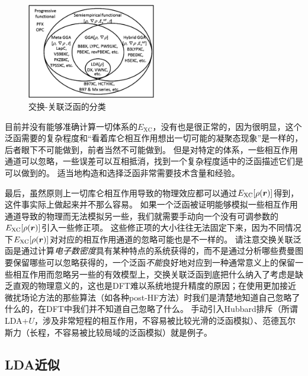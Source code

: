 \begin{figure}
    \centering
    \includegraphics[width=0.5\textwidth]{functional-classification.png}
    \caption{交换-关联泛函的分类}
    \label{fig:excahnge-correlation-functional}
\end{figure}

目前并没有能够准确计算一切体系的$E_\text{XC}$，没有也是很正常的，因为很明显，这个泛函需要的复杂程度和“看着库仑相互作用想出一切可能的凝聚态现象”是一样的，后者眼下不可能做到，前者当然不可能做到。
但是对特定的体系，一些相互作用通道可以忽略，一些误差可以互相抵消，找到一个复杂程度适中的泛函描述它们是可以做到的。
适当地构造和选择泛函非常需要技术含量和经验。

最后，虽然原则上一切库仑相互作用导致的物理效应都可以通过$E_\text{XC}[\rho(\vb*{r})]$得到，这件事实际上做起来并不那么容易。
如果一个泛函被证明能够模拟一些相互作用通道导致的物理而无法模拟另一些，我们就需要手动向一个没有可调参数的$E_\text{XC}[\rho(\vb*{r})]$引入一些修正项。
这些修正项的大小往往无法固定下来，因为不同情况下$E_\text{XC}[\rho(\vb*{r})]$对对应的相互作用通道的忽略可能也是不一样的。
请注意交换关联泛函是通过计算\emph{电子数密度}具有某种特点的系统获得的，而不是通过分析哪些费曼图要保留哪些可以忽略获得的，一个泛函\emph{不能}良好地对应到一种通常意义上的保留一些相互作用而忽略另一些的有效模型上，交换关联泛函到底把什么纳入了考虑是缺乏直观的物理意义的，这也是DFT难以系统地提升精度的原因；在使用更加接近微扰场论方法的那些算法（如各种post-HF方法）时我们是清楚地知道自己忽略了什么的，在DFT中我们并不知道自己忽略了什么。
手动引入Hubbard排斥（所谓LDA+$U$，涉及非常短程的相互作用，不容易被比较光滑的泛函模拟）、范德瓦尔斯力（长程，不容易被比较局域的泛函模拟）就是例子。

\subsection{LDA近似}


